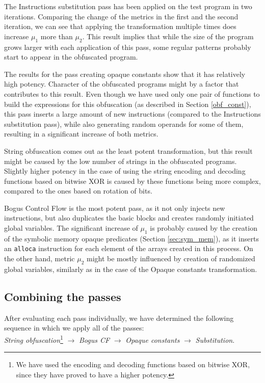 \documentclass[
  digital, %
  notable,   %
  twoside, %
  nolof,     %
  nolot,     %
]{fithesis3}
\theoremstyle{definition}
\begin{document}
The Instructions substitution pass has been applied on the test program in two iterations. Comparing the change of the metrics in the first and the second iteration, we can see that applying the transformation multiple times does increase $\mu_1$ more than $\mu_2$. This result implies that while the size of the program grows larger with each application of this pass, some regular patterns probably start to appear in the obfuscated program.

The results for the pass creating opaque constants show that it has relatively high potency. Character of the obfuscated programs might by a factor that contributes to this result. Even though we have used only one pair of functions to build the expressions for this obfuscation (as described in Section \ref{obf_const}), this pass inserts a large amount of new instructions (compared to the Instructions substitution pass), while also generating random operands for some of them, resulting in a significant increase of both metrics. 

String obfuscation comes out as the least potent transformation, but this result might be caused by the low number of strings in the obfuscated programs. Slightly higher potency in the case of using the string encoding and decoding functions based on bitwise XOR is caused by these functions being more complex, compared to the ones based on rotation of bits. 

Bogus Control Flow is the most potent pass, as it not only injects new instructions, but also duplicates the basic blocks and creates randomly initiated global variables. The significant increase of $\mu_1$ is probably caused by the creation of the symbolic memory opaque predicates (Section \ref{sec:sym_mem}), as it inserts an \texttt{alloca} instruction for each element of the arrays created in this process. On the other hand, metric $\mu_2$ might be mostly influenced by creation of randomized global variables, similarly as in the case of the Opaque constants transformation. 

\subsection{Combining the passes}

After evaluating each pass individually, we have determined the following sequence in which we apply all of the passes: \\

\textit{String obfuscation}\footnote{We have used the encoding and decoding functions based on bitwise XOR, since they have proved to have a higher potency.} $\rightarrow$ \textit{Bogus CF} $\rightarrow$ \textit{Opaque constants} $\rightarrow$ \textit{Substitution}. \\
\end{document}
